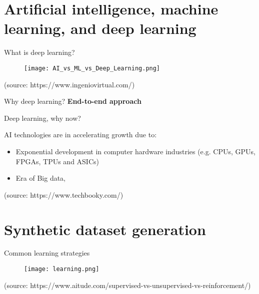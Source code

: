 \documentclass[10pt,aspectratio=169]{beamer} %
\begin{document}
\section{Artificial intelligence, machine learning, and deep learning}
\begin{frame}{What is deep learning?}
	\begin{figure}
		\centering
		\texttt{[image: AI\_vs\_ML\_vs\_Deep\_Learning.png]}
	\end{figure}
	\tiny
	(source: https://www.ingeniovirtual.com/)
\end{frame}
\begin{frame}{Why deep learning?}
	\centering
	\textbf{End-to-end approach} 
	\par\medskip
\end{frame}
\setcounter{subfigure}{0}
\begin{frame}{Deep learning, why now?}
	\begin{minipage}[c]{0.4\textwidth}
		AI technologies are in accelerating growth due to:
		\begin{itemize}
			\item Exponential development in computer hardware industries
			 (e.g. CPUs, GPUs, FPGAs, TPUs and ASICs)
			\item Era of Big data,
		\end{itemize}
	\end{minipage}
	\begin{minipage}[c]{0.55\textwidth}
		\begin{figure}
			\centering
		\end{figure}
	\tiny
	(source: https://www.techbooky.com/)
	\end{minipage}
	
\end{frame}
\section{Synthetic dataset generation}
\setcounter{subfigure}{0}
\begin{frame}{Common learning strategies}
	\centering
	\begin{figure}
		\texttt{[image: learning.png]}
	\end{figure}
	\tiny
	(source: https://www.aitude.com/supervised-vs-unsupervised-vs-reinforcement/)
\end{frame}
\setcounter{subfigure}{0}
\end{document}
